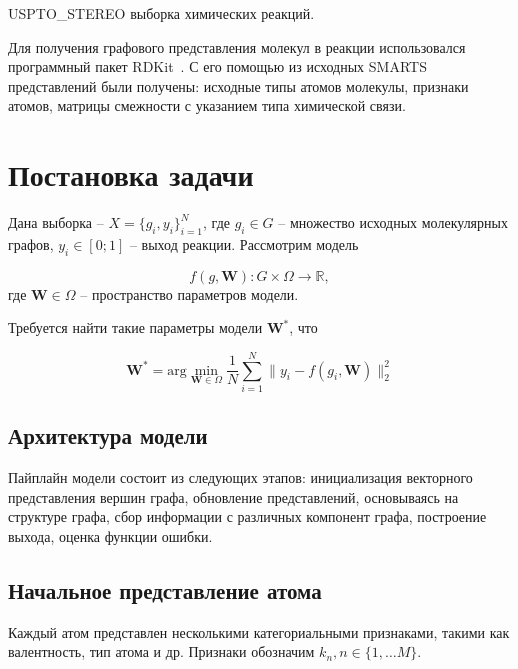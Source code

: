 \documentclass[12pt, twoside]{article}
\begin{document}
\begin{table}[h!]
\caption{USPTO\_STEREO выборка химических реакций.}
\label{tab:dataset}

\end{table}

Для получения графового представления молекул в реакции использовался программный пакет RDKit~\cite{rdkit}. С его помощью из исходных SMARTS представлений были получены: исходные типы атомов молекулы, признаки атомов, матрицы смежности с указанием типа химической связи. 


\section{Постановка задачи}

Дана выборка -- $X = \{g_i, y_i\}_{i = 1}^N$, где $g_i \in G$ -- множество исходных молекулярных графов, $y_i \in [0;1]$ -- выход реакции. Рассмотрим модель 

\begin{equation}
    f(g, \mathbf{W}):G\times\Omega \rightarrow \mathbb{R},
\end{equation}
 где $\mathbf{W} \in \Omega$ -- пространство параметров модели.
 
 Требуется найти такие параметры модели $\mathbf{W}^*$, что
 
 \begin{equation}
     \mathbf{W}^* = \text{arg}\min_{\mathbf{W} \in \Omega} \dfrac{1}{N}\sum_{i = 1}^N \|y_i - f(g_i, \mathbf{W})\|_2^2
 \end{equation}
 
 \subsection{Архитектура модели}
 
 Пайплайн модели состоит из следующих этапов: инициализация векторного представления вершин графа, обновление представлений, основываясь на структуре графа, сбор информации с различных компонент графа, построение выхода, оценка функции ошибки.

 

 \subsection{Начальное представление атома}
 
 Каждый атом представлен несколькими категориальными признаками, такими как валентность, тип атома и др. Признаки обозначим $k_n, n \in \{1, \ldots M\}$.
 
\end{document}
